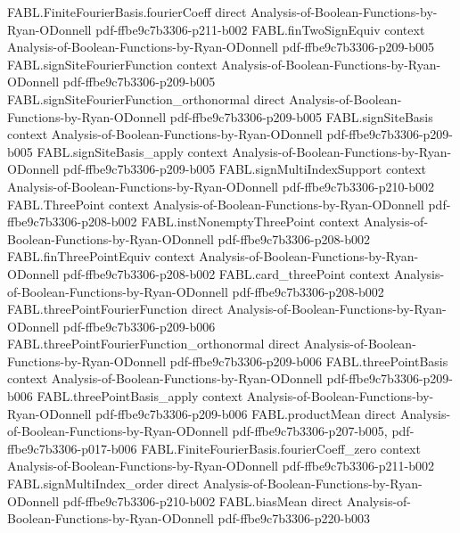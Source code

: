 \begin{theorem}
\proofstep
  {FABL.FiniteFourierBasis.fourierCoeff}
  {direct}
  {Analysis-of-Boolean-Functions-by-Ryan-ODonnell}
  {pdf-ffbe9c7b3306-p211-b002}
\proofstep
  {FABL.finTwoSignEquiv}
  {context}
  {Analysis-of-Boolean-Functions-by-Ryan-ODonnell}
  {pdf-ffbe9c7b3306-p209-b005}
\proofstep
  {FABL.signSiteFourierFunction}
  {context}
  {Analysis-of-Boolean-Functions-by-Ryan-ODonnell}
  {pdf-ffbe9c7b3306-p209-b005}
\proofstep
  {FABL.signSiteFourierFunction_orthonormal}
  {direct}
  {Analysis-of-Boolean-Functions-by-Ryan-ODonnell}
  {pdf-ffbe9c7b3306-p209-b005}
\proofstep
  {FABL.signSiteBasis}
  {context}
  {Analysis-of-Boolean-Functions-by-Ryan-ODonnell}
  {pdf-ffbe9c7b3306-p209-b005}
\proofstep
  {FABL.signSiteBasis_apply}
  {context}
  {Analysis-of-Boolean-Functions-by-Ryan-ODonnell}
  {pdf-ffbe9c7b3306-p209-b005}
\proofstep
  {FABL.signMultiIndexSupport}
  {context}
  {Analysis-of-Boolean-Functions-by-Ryan-ODonnell}
  {pdf-ffbe9c7b3306-p210-b002}
\proofstep
  {FABL.ThreePoint}
  {context}
  {Analysis-of-Boolean-Functions-by-Ryan-ODonnell}
  {pdf-ffbe9c7b3306-p208-b002}
\proofstep
  {FABL.instNonemptyThreePoint}
  {context}
  {Analysis-of-Boolean-Functions-by-Ryan-ODonnell}
  {pdf-ffbe9c7b3306-p208-b002}
\proofstep
  {FABL.finThreePointEquiv}
  {context}
  {Analysis-of-Boolean-Functions-by-Ryan-ODonnell}
  {pdf-ffbe9c7b3306-p208-b002}
\proofstep
  {FABL.card_threePoint}
  {context}
  {Analysis-of-Boolean-Functions-by-Ryan-ODonnell}
  {pdf-ffbe9c7b3306-p208-b002}
\proofstep
  {FABL.threePointFourierFunction}
  {direct}
  {Analysis-of-Boolean-Functions-by-Ryan-ODonnell}
  {pdf-ffbe9c7b3306-p209-b006}
\proofstep
  {FABL.threePointFourierFunction_orthonormal}
  {direct}
  {Analysis-of-Boolean-Functions-by-Ryan-ODonnell}
  {pdf-ffbe9c7b3306-p209-b006}
\proofstep
  {FABL.threePointBasis}
  {context}
  {Analysis-of-Boolean-Functions-by-Ryan-ODonnell}
  {pdf-ffbe9c7b3306-p209-b006}
\proofstep
  {FABL.threePointBasis_apply}
  {context}
  {Analysis-of-Boolean-Functions-by-Ryan-ODonnell}
  {pdf-ffbe9c7b3306-p209-b006}
\proofstep
  {FABL.productMean}
  {direct}
  {Analysis-of-Boolean-Functions-by-Ryan-ODonnell}
  {pdf-ffbe9c7b3306-p207-b005,
    pdf-ffbe9c7b3306-p017-b006}
\proofstep
  {FABL.FiniteFourierBasis.fourierCoeff_zero}
  {context}
  {Analysis-of-Boolean-Functions-by-Ryan-ODonnell}
  {pdf-ffbe9c7b3306-p211-b002}
\proofstep
  {FABL.signMultiIndex_order}
  {direct}
  {Analysis-of-Boolean-Functions-by-Ryan-ODonnell}
  {pdf-ffbe9c7b3306-p210-b002}
\proofstep
  {FABL.biasMean}
  {direct}
  {Analysis-of-Boolean-Functions-by-Ryan-ODonnell}
  {pdf-ffbe9c7b3306-p220-b003}

\end{theorem}
